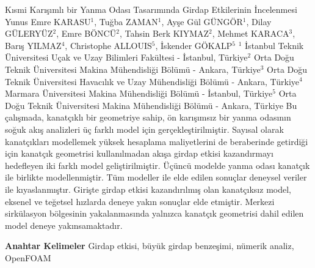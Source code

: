 
    \begin{abstract_online}{Kısmi Karışımlı bir Yanma Odası Tasarımında Girdap Etkilerinin İncelenmesi}{%
        Yunus Emre KARASU$^{1}$, Tuğba ZAMAN$^{1}$, Ayşe Gül GÜNGÖR$^{1}$, Dilay GÜLERYÜZ$^{2}$, Emre BÖNCÜ$^{2}$, Tahsin Berk KIYMAZ$^{2}$, Mehmet KARACA$^{3}$, Barış YILMAZ$^{4}$, Christophe ALLOUIS$^{5}$, İskender GÖKALP$^{5}$}{%
        }{%
        $^1$ İstanbul Teknik Üniversitesi Uçak ve Uzay Bilimleri Fakültesi - İstanbul, Türkiye\newline{}$^2$ Orta Doğu Teknik Üniversitesi Makina Mühendisliği Bölümü - Ankara, Türkiye\newline{}$^3$ Orta Doğu Teknik Üniversitesi Havacılık ve Uzay Mühendisliği Bölümü - Ankara, Türkiye\newline{}$^4$ Marmara Üniversitesi Makina Mühendisliği Bölümü - İstanbul, Türkiye\newline{}$^5$ Orta Doğu Teknik Üniversitesi Makina Mühendisliği Bölümü - Ankara, Türkiye}
    Bu çalışmada, kanatçıklı bir geometriye sahip, ön karışımsız bir yanma odasının soğuk akış analizleri üç farklı model için gerçekleştirilmiştir. Sayısal olarak kanatçıkları modellemek yüksek hesaplama maliyetlerini de beraberinde getirdiği için kanatçık geometrisi kullanılmadan akışa girdap etkisi kazandırmayı hedefleyen iki farklı model geliştirilmiştir. Üçüncü modelde yanma odası kanatçık ile birlikte modellenmiştir. Tüm modeller ile elde edilen sonuçlar deneysel veriler ile kıyaslanmıştır. \newline Girişte girdap etkisi kazandırılmış olan kanatçıksız model, eksenel ve teğetsel hızlarda deneye yakın sonuçlar elde etmiştir. Merkezi sirkülasyon bölgesinin yakalanmasında yalnızca kanatçık geometrisi dahil edilen model deneye yakınsamaktadır. 
    
            \textbf{Anahtar Kelimeler} \newline{}Girdap etkisi, büyük girdap benzeşimi, nümerik analiz, OpenFOAM
    \end{abstract_online}
    